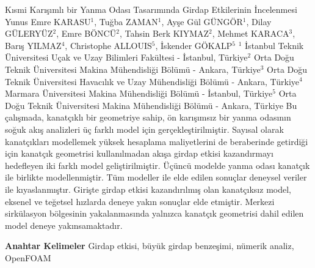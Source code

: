 
    \begin{abstract_online}{Kısmi Karışımlı bir Yanma Odası Tasarımında Girdap Etkilerinin İncelenmesi}{%
        Yunus Emre KARASU$^{1}$, Tuğba ZAMAN$^{1}$, Ayşe Gül GÜNGÖR$^{1}$, Dilay GÜLERYÜZ$^{2}$, Emre BÖNCÜ$^{2}$, Tahsin Berk KIYMAZ$^{2}$, Mehmet KARACA$^{3}$, Barış YILMAZ$^{4}$, Christophe ALLOUIS$^{5}$, İskender GÖKALP$^{5}$}{%
        }{%
        $^1$ İstanbul Teknik Üniversitesi Uçak ve Uzay Bilimleri Fakültesi - İstanbul, Türkiye\newline{}$^2$ Orta Doğu Teknik Üniversitesi Makina Mühendisliği Bölümü - Ankara, Türkiye\newline{}$^3$ Orta Doğu Teknik Üniversitesi Havacılık ve Uzay Mühendisliği Bölümü - Ankara, Türkiye\newline{}$^4$ Marmara Üniversitesi Makina Mühendisliği Bölümü - İstanbul, Türkiye\newline{}$^5$ Orta Doğu Teknik Üniversitesi Makina Mühendisliği Bölümü - Ankara, Türkiye}
    Bu çalışmada, kanatçıklı bir geometriye sahip, ön karışımsız bir yanma odasının soğuk akış analizleri üç farklı model için gerçekleştirilmiştir. Sayısal olarak kanatçıkları modellemek yüksek hesaplama maliyetlerini de beraberinde getirdiği için kanatçık geometrisi kullanılmadan akışa girdap etkisi kazandırmayı hedefleyen iki farklı model geliştirilmiştir. Üçüncü modelde yanma odası kanatçık ile birlikte modellenmiştir. Tüm modeller ile elde edilen sonuçlar deneysel veriler ile kıyaslanmıştır. \newline Girişte girdap etkisi kazandırılmış olan kanatçıksız model, eksenel ve teğetsel hızlarda deneye yakın sonuçlar elde etmiştir. Merkezi sirkülasyon bölgesinin yakalanmasında yalnızca kanatçık geometrisi dahil edilen model deneye yakınsamaktadır. 
    
            \textbf{Anahtar Kelimeler} \newline{}Girdap etkisi, büyük girdap benzeşimi, nümerik analiz, OpenFOAM
    \end{abstract_online}
    